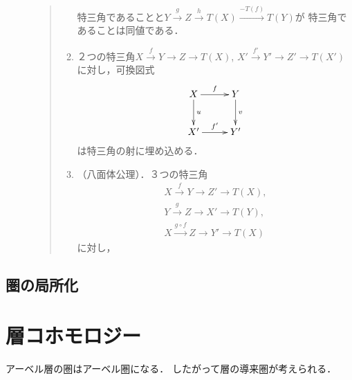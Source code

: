 \begin{Definition}
\begin{description}
\begin{quote}
\begin{enumerate}
                    特三角であることと$Y\overset{g}{\longrightarrow}
                    Z\overset{h}{\longrightarrow} T(X)\overset{-T(f)}{\longrightarrow} T(Y)$が
                    特三角であることは同値である．\label{TR3}
                \item ２つの特三角$X\overset{f}{\to}
                Y\to Z\to T(X)$, $X'\overset{f'}{\to}
                Y'\to Z'\to T(X')$に対し，可換図式
                \begin{equation*}
                    \vcenter{\xymatrix
                    @C=26pt@R=26pt
                    {
                    X\ar[r]^-{f}\ar[d]^-{u}
                    &
                    Y\ar[d]^-{v} 
                    \\
                    X'\ar[r]^-{f'}
                    &
                    Y'
                    }}
                \end{equation*}
                は特三角の射に埋め込める．\label{TR4}
                \item（八面体公理）．３つの特三角
                \begin{align*}
                    X\overset{f}{\to}Y\to Z'\to T(X), \\
                    Y\overset{g}{\to}Z\to X'\to T(Y),\\
                    X\overset{g\circ f}{\longrightarrow}
                    Z\to Y'\to T(X)
                \end{align*}
                に対し， \label{TR5}
            \end{enumerate}    
        \end{quote}
    \end{description}
\end{Definition}

\subsection{圏の局所化}



\clearpage
\section{層コホモロジー}
アーベル層の圏はアーベル圏になる．
したがって層の導来圏が考えられる．

